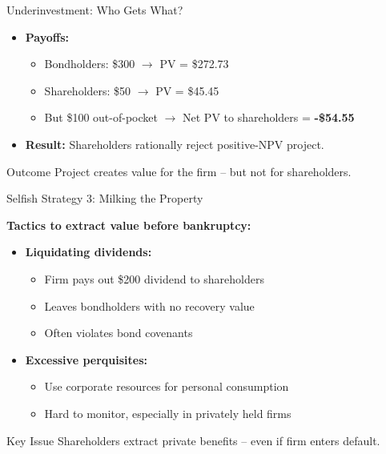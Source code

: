 \begin{frame}{Underinvestment: Who Gets What?}
	
	\begin{itemize}
		\item \textbf{Payoffs:}
		\begin{itemize}
			\item Bondholders: \$300 $\rightarrow$ PV = \$272.73
			\item Shareholders: \$50 $\rightarrow$ PV = \$45.45
			\item But \$100 out-of-pocket $\rightarrow$ Net PV to shareholders = \textbf{-\$54.55}
		\end{itemize}
		
		\item \textbf{Result:} Shareholders rationally reject positive-NPV project.
		
	\end{itemize}
	
	\begin{alertblock}{Outcome}
		Project creates value for the firm -- but not for shareholders.
	\end{alertblock}
	
\end{frame}

\begin{frame}{Selfish Strategy 3: Milking the Property}
	
	\textbf{Tactics to extract value before bankruptcy:}
	
	\begin{itemize}
		\item \textbf{Liquidating dividends:}
		\begin{itemize}
			\item Firm pays out \$200 dividend to shareholders
			\item Leaves bondholders with no recovery value
			\item Often violates bond covenants
		\end{itemize}
		
		\item \textbf{Excessive perquisites:}
		\begin{itemize}
			\item Use corporate resources for personal consumption
			\item Hard to monitor, especially in privately held firms
		\end{itemize}
	\end{itemize}
	
	\begin{alertblock}{Key Issue}
		Shareholders extract private benefits -- even if firm enters default.
	\end{alertblock}
	
\end{frame}


